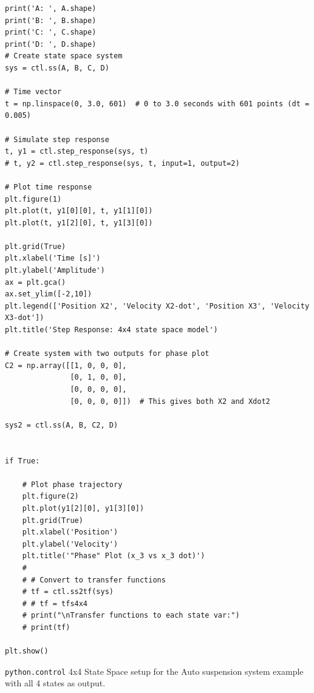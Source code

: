 \begin{listing}
\begin{verbatim}
print('A: ', A.shape)
print('B: ', B.shape)
print('C: ', C.shape)
print('D: ', D.shape)
# Create state space system
sys = ctl.ss(A, B, C, D)

# Time vector
t = np.linspace(0, 3.0, 601)  # 0 to 3.0 seconds with 601 points (dt = 0.005)

# Simulate step response
t, y1 = ctl.step_response(sys, t)
# t, y2 = ctl.step_response(sys, t, input=1, output=2)

# Plot time response
plt.figure(1)
plt.plot(t, y1[0][0], t, y1[1][0])
plt.plot(t, y1[2][0], t, y1[3][0])

plt.grid(True)
plt.xlabel('Time [s]')
plt.ylabel('Amplitude')
ax = plt.gca()
ax.set_ylim([-2,10])
plt.legend(['Position X2', 'Velocity X2-dot', 'Position X3', 'Velocity X3-dot'])
plt.title('Step Response: 4x4 state space model')

# Create system with two outputs for phase plot
C2 = np.array([[1, 0, 0, 0],
               [0, 1, 0, 0],
               [0, 0, 0, 0],
               [0, 0, 0, 0]])  # This gives both X2 and Xdot2

sys2 = ctl.ss(A, B, C2, D)


if True:

    # Plot phase trajectory
    plt.figure(2)
    plt.plot(y1[2][0], y1[3][0])
    plt.grid(True)
    plt.xlabel('Position')
    plt.ylabel('Velocity')
    plt.title('"Phase" Plot (x_3 vs x_3 dot)')
    #
    # # Convert to transfer functions
    # tf = ctl.ss2tf(sys)
    # # tf = tfs4x4
    # print("\nTransfer functions to each state var:")
    # print(tf)

plt.show()
    \end{verbatim}
    \caption{{\tt python.control} 4x4 State Space setup for the Auto suspension system example with all 4 states as output.}
    \label{lst:ss4x4}
\end{listing}


